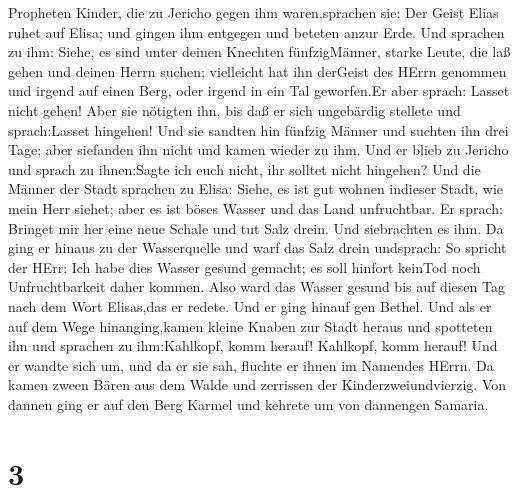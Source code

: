 Propheten Kinder, die zu Jericho gegen ihm waren,sprachen sie: Der Geist
Elias ruhet auf Elisa; und gingen ihm entgegen und beteten anzur Erde.
 Und sprachen zu ihm: Siehe, es sind unter deinen Knechten
fünfzigMänner, starke Leute, die laß gehen und deinen Herrn suchen;
vielleicht hat ihn derGeist des HErrn genommen und irgend auf einen
Berg, oder irgend in ein Tal geworfen.Er aber sprach: Lasset nicht
gehen!  Aber sie nötigten ihn, bis daß er sich ungebärdig
stellete und sprach:Lasset hingehen! Und sie sandten hin fünfzig Männer
und suchten ihn drei Tage; aber siefanden ihn nicht  und
kamen wieder zu ihm. Und er blieb zu Jericho und sprach zu ihnen:Sagte
ich euch nicht, ihr solltet nicht hingehen?  Und die Männer
der Stadt sprachen zu Elisa: Siehe, es ist gut wohnen indieser Stadt,
wie mein Herr siehet; aber es ist böses Wasser und das Land unfruchtbar.
 Er sprach: Bringet mir her eine neue Schale und tut Salz
drein. Und siebrachten es ihm.  Da ging er hinaus zu der
Wasserquelle und warf das Salz drein undsprach: So spricht der HErr: Ich
habe dies Wasser gesund gemacht; es soll hinfort keinTod noch
Unfruchtbarkeit daher kommen.  Also ward das Wasser gesund
bis auf diesen Tag nach dem Wort Elisas,das er redete.  Und
er ging hinauf gen Bethel. Und als er auf dem Wege hinanging,kamen
kleine Knaben zur Stadt heraus und spotteten ihn und sprachen zu
ihm:Kahlkopf, komm herauf! Kahlkopf, komm herauf!  Und er
wandte sich um, und da er sie sah, fluchte er ihnen im Namendes HErrn.
Da kamen zween Bären aus dem Walde und zerrissen der
Kinderzweiundvierzig.  Von dannen ging er auf den Berg
Karmel und kehrete um von dannengen Samaria.

\hypertarget{section-2}{%
\section{3}\label{section-2}}

